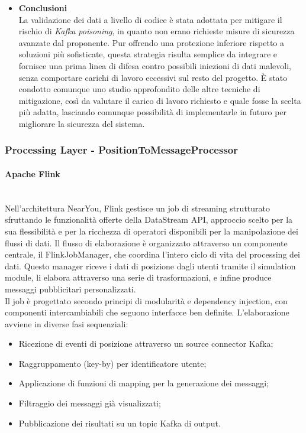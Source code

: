 \documentclass[10pt]{article}
\newcommand{\myparagraph}[1]{\paragraph{#1}\mbox{}\\}
\begin{document}
\begin{itemize}
\begin{itemize}
\begin{itemize}
                \end{itemize}
            \end{itemize}
            \item \textbf{Conclusioni}\\
                La validazione dei dati a livello di codice è stata adottata per mitigare il rischio di \textit{Kafka poisoning}, in quanto non erano richieste misure di sicurezza avanzate dal proponente. Pur offrendo una protezione inferiore rispetto a soluzioni più sofisticate, questa strategia risulta semplice da integrare e fornisce una prima linea di difesa contro possibili iniezioni di dati malevoli, senza comportare carichi di lavoro eccessivi sul resto del progetto. È stato condotto comunque uno studio approfondito delle altre tecniche di mitigazione, così da valutare il carico di lavoro richiesto e quale fosse la scelta più adatta, lasciando comunque possibilità di implementarle in futuro per migliorare la sicurezza del sistema.\\
        \end{itemize}
        









        \subsubsection{Processing Layer - PositionToMessageProcessor}
        \myparagraph{Apache Flink}
        Nell'architettura NearYou, Flink gestisce un job di streaming strutturato sfruttando le funzionalità offerte della DataStream API,
        approccio scelto per la sua flessibilità e per la ricchezza di operatori disponibili per la manipolazione dei flussi di dati.
        Il flusso di elaborazione è organizzato attraverso un componente centrale, il FlinkJobManager, che coordina l'intero ciclo di vita del processing dei dati.
        Questo manager riceve i dati di posizione dagli utenti tramite il simulation module, li elabora attraverso una serie di trasformazioni, e infine produce messaggi pubblicitari personalizzati. \\
        Il job è progettato secondo principi di modularità e dependency injection, con componenti intercambiabili che seguono interfacce ben definite.
        L'elaborazione avviene in diverse fasi sequenziali:

        \begin{itemize}
            \item Ricezione di eventi di posizione attraverso un source connector Kafka;
            \item Raggruppamento (key-by) per identificatore utente;
            \item Applicazione di funzioni di mapping per la generazione dei messaggi;
            \item Filtraggio dei messaggi già visualizzati;
            \item Pubblicazione dei risultati su un topic Kafka di output.
        \end{itemize}
\end{document}
